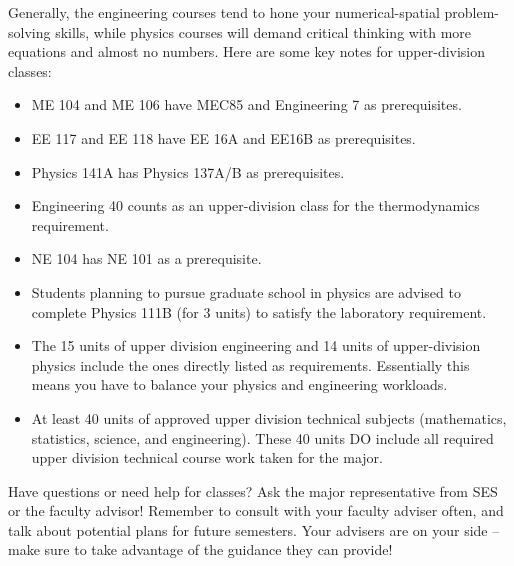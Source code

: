 Generally, the engineering courses tend to hone your numerical-spatial problem-solving skills, while physics courses will demand critical thinking with more equations and almost no numbers.
Here are some key notes for upper-division classes:
\begin{itemize}
    \item ME 104 and ME 106 have MEC85 and Engineering 7 as prerequisites.
    \item EE 117 and EE 118 have EE 16A and EE16B as prerequisites.
    \item Physics 141A has Physics 137A/B as prerequisites.
    \item Engineering 40 counts as an upper-division class for the thermodynamics requirement.
    \item NE 104 has NE 101 as a prerequisite.
    \item Students planning to pursue graduate school in physics are advised to complete Physics 111B (for 3 units) to satisfy the laboratory requirement.
    \item The 15 units of upper division engineering and 14 units of upper-division physics include the ones directly listed as requirements.  Essentially this means you have to balance your physics and engineering workloads.
    \item At least 40 units of approved upper division technical subjects (mathematics, statistics, science, and engineering). These 40 units DO include all required upper division technical course work taken for the major.
\end{itemize}

Have questions or need help for classes? Ask the major representative from SES or the faculty advisor! Remember to consult with your faculty adviser often, and talk about potential plans for future semesters. Your advisers are on your side – make sure to take advantage of the guidance they can provide!


